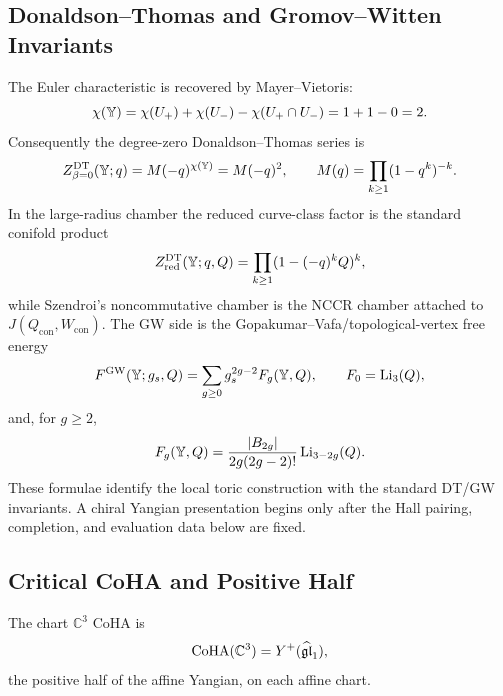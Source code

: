 \subsection*{Donaldson--Thomas and Gromov--Witten Invariants}

The Euler characteristic is recovered by Mayer--Vietoris:
\[
  \chi(\mathbb{Y})=\chi(U_+)+\chi(U_-)-\chi(U_+\cap U_-)
  =1+1-0=2.
\]
Consequently the degree-zero Donaldson--Thomas series is
\[
  Z^{\mathrm{DT}}_{\beta=0}(\mathbb{Y};q)
  =M(-q)^{\chi(\mathbb{Y})}
  =M(-q)^2,
  \qquad M(q)=\prod_{k\ge1}(1-q^k)^{-k}.
\]
In the large-radius chamber the reduced curve-class factor is the
standard conifold product
\[
  Z^{\mathrm{DT}}_{\mathrm{red}}(\mathbb{Y};q,Q)
  =
  \prod_{k\ge1}(1-(-q)^kQ)^k,
\]
while Szendroi's noncommutative chamber is the NCCR chamber attached
to $J(Q_{\mathrm{con}},W_{\mathrm{con}})$. The GW side is the
Gopakumar--Vafa/topological-vertex free energy
\[
  F^{\mathrm{GW}}(\mathbb{Y};g_s,Q)
  =
  \sum_{g\ge0}g_s^{2g-2}F_g(\mathbb{Y},Q),
  \qquad
  F_0=\mathrm{Li}_3(Q),
\]
and, for $g\ge2$,
\[
  F_g(\mathbb{Y},Q)=
  \frac{|B_{2g}|}{2g(2g-2)!}\,
  \mathrm{Li}_{3-2g}(Q).
\]
These formulae identify the local toric construction with the standard
DT/GW invariants. A chiral Yangian presentation begins only after the
Hall pairing, completion, and evaluation data below are fixed.

\subsection*{Critical CoHA and Positive Half}

The chart $\mathbb C^3$ CoHA is
\[
  \mathrm{CoHA}(\mathbb C^3)=Y^+(\widehat{\mathfrak{gl}}_1),
\]
the positive half of the affine Yangian, on each affine chart.

